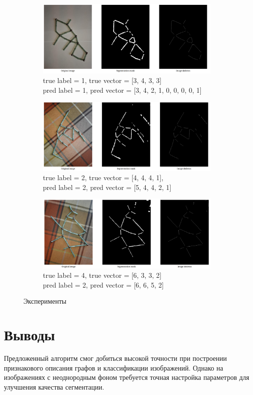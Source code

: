 \documentclass[11pt]{extarticle}
\begin{document}
\begin{figure}[h]
  \centering
  \begin{subfigure}[b]{0.9\textwidth}
    \includegraphics[width=\textwidth]{exp1}
    \caption{true label = 1, true vector = [3, 4, 3, 3] \\ pred label = 1, pred vector = [3, 4, 2, 1, 0, 0, 0, 0, 1]}
  \end{subfigure}
  \begin{subfigure}[b]{0.9\textwidth}
    \includegraphics[width=\textwidth]{exp2}
    \caption{true label = 2, true vector = [4, 4, 4, 1], \\ pred label = 2, pred vector = [5, 4, 4, 2, 1]}
  \end{subfigure}
  \begin{subfigure}[b]{0.9\textwidth}
    \includegraphics[width=\textwidth]{exp3}
    \caption{true label = 4, true vector = [6, 3, 3, 2] \\ pred label = 2, pred vector = [6, 6, 5, 2]}
  \end{subfigure}
  \caption{Эксперименты}
  \label{fig:exp}
\end{figure}


\section{Выводы}
Предложенный алгоритм смог добиться высокой точности при построении признакового описания графов и классификации изображений. Однако на изображениях с неоднородным фоном требуется точная настройка параметров для улучшения качества сегментации.
\end{document}
